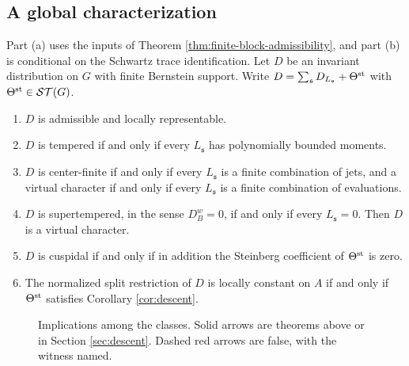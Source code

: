 \subsection{A global characterization}\label{sub:global}
\begin{theorem}\label{thm:global}
Part (a) uses the inputs of Theorem \ref{thm:finite-block-admissibility}, and part (b) is conditional on the Schwartz trace identification.
Let $D$ be an invariant distribution on $G$ with finite Bernstein support. Write $D=\sum_{\mathfrak s}D_{L_{\mathfrak s}}+\Theta^{\rm st}$ with $\Theta^{\rm st}\in\mathcal{ST}(G)$.
\begin{enumerate}[label=(\alph*),leftmargin=*]
\item $D$ is admissible and locally representable.
\item $D$ is tempered if and only if every $L_{\mathfrak s}$ has polynomially bounded moments.
\item $D$ is center-finite if and only if every $L_{\mathfrak s}$ is a finite combination of jets, and a virtual character if and only if every $L_{\mathfrak s}$ is a finite combination of evaluations.
\item $D$ is supertempered, in the sense $D^w_B=0$, if and only if every $L_{\mathfrak s}=0$. Then $D$ is a virtual character.
\item $D$ is cuspidal if and only if in addition the Steinberg coefficient of $\Theta^{\rm st}$ is zero.
\item The normalized split restriction of $D$ is locally constant on $A$ if and only if $\Theta^{\rm st}$ satisfies Corollary \ref{cor:descent}.
\end{enumerate}
\end{theorem}
\begin{figure}[htbp]\centering
{}
\caption{Implications among the classes. Solid arrows are theorems above or in Section \ref{sec:descent}. Dashed red arrows are false, with the witness named.}\label{fig:global}
\end{figure}

